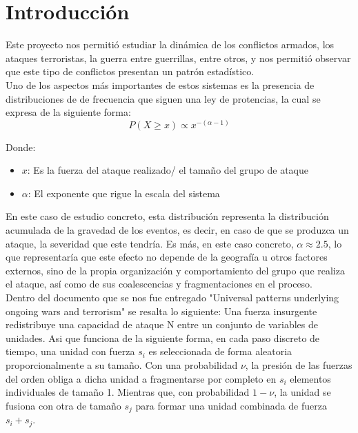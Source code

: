 \documentclass[twoside, a4paper, 12pt, spanish]{article}
\begin{document}

\section{Introducción}
Este proyecto nos permitió estudiar la dinámica de los conflictos armados, los ataques terroristas, la guerra entre guerrillas, entre otros, y nos permitió observar que este tipo de conflictos presentan un patrón estadístico. \\

Uno de los aspectos más importantes de estos sistemas es la presencia de distribuciones de de frecuencia que siguen una ley de protencias,  la cual se expresa de la siguiente forma:\\

$$P(X \geq x) \propto x^{-(\alpha -1)} $$

Donde:
\begin{itemize}
    \item $x$: Es la fuerza del ataque realizado/ el tamaño del grupo de ataque
    \item $\alpha$: El exponente que rigue la escala del sistema
\end{itemize}

En este caso de estudio concreto, esta distribución representa la distribución acumulada de la gravedad de los eventos, es decir, en caso de que se produzca un ataque, la severidad que este tendría. Es más, en este caso concreto, $\alpha \approx 2.5$, lo que representaría que este efecto no depende de la geografía u otros factores externos, sino de la propia organización y comportamiento del grupo que realiza el ataque, así como de sus coalescencias y fragmentaciones en el proceso.\\

Dentro del documento que se nos fue entregado "Universal patterns underlying ongoing wars and terrorism" se resalta lo siguiente: Una fuerza insurgente redistribuye una capacidad de ataque N entre un conjunto de variables de unidades. Asi que funciona de la siguiente forma, en cada paso discreto de tiempo, una unidad con fuerza 
$s_i$ es seleccionada de forma aleatoria proporcionalmente a su tamaño. Con una probabilidad $\nu$, la presión de las fuerzas del orden obliga a dicha unidad a fragmentarse por completo en $s_i$ elementos individuales de tamaño 1. Mientras que, con probabilidad $1 - \nu$, la unidad se fusiona con otra de tamaño $s_j$ para formar una unidad combinada de fuerza $s_i + s_j$.   \\
\end{document}
